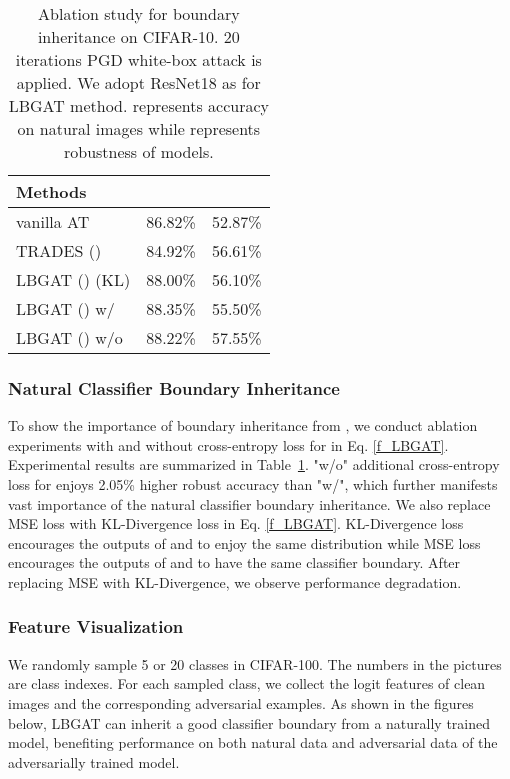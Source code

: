 \documentclass[10pt,twocolumn,letterpaper]{article}
\begin{document}
\begin{table}
	\centering
	\caption{Ablation study for boundary inheritance on CIFAR-10. 20 iterations PGD white-box attack is applied. We adopt ResNet18 as  for LBGAT method.  represents accuracy on natural images while  represents robustness of models.} 
	\resizebox{0.80\linewidth}{!}
	{
		\begin{tabular}{l|c|c}
			\textbf{Methods} & & \\
			\hline
			\hline
			vanilla AT          &86.82\% &52.87\% \\
			TRADES () &84.92\% &56.61\% \\
			LBGAT () (KL)        &88.00\%  &56.10\% \\
			LBGAT () w/          &88.35\% &55.50\% \\
			LBGAT () w/o         &88.22\% &57.55\% \\
			\hline
			\hline
		\end{tabular}
		\label{tab:ablation_boundary_inheritance}
	}
\end{table}

\subsubsection{Natural Classifier Boundary Inheritance}
\label{sec:L_function}
To show the importance of boundary inheritance from , we conduct ablation experiments with and without cross-entropy loss for  in Eq. \eqref{f_LBGAT}. Experimental results are summarized in Table~\ref{tab:ablation_boundary_inheritance}. "w/o" additional cross-entropy loss for  enjoys 2.05\% higher robust accuracy than "w/", which further manifests vast importance of the natural classifier boundary inheritance.  We also replace MSE loss with KL-Divergence loss in Eq. \eqref{f_LBGAT}. KL-Divergence loss encourages the outputs of  and
 to enjoy the same distribution while MSE loss encourages the outputs of  and  to have the same classifier boundary. After replacing MSE with KL-Divergence, we observe performance degradation.

\subsubsection{Feature Visualization}
We randomly sample 5 or 20 classes in CIFAR-100. The numbers in the pictures are class indexes. For each sampled class, we collect the logit features of clean images and the corresponding adversarial examples. As shown in the figures below, LBGAT can inherit a good classifier boundary from a naturally trained model, benefiting performance on both natural data and adversarial data of the adversarially trained model. 
\end{document}
